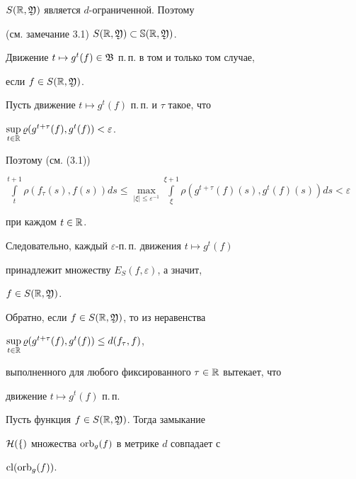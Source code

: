 $S(\Bbb R,\frak Y)$ является $d$-ограниченной. Поэтому


(см. замечание 3.1) $S(\Bbb R,\frak Y)\subset\Bbb S(\Bbb R,\frak Y)$.








\begin{lems}


Движение $t\mapsto g^t(f)\in\frak B$ п.\,п. в том и только том случае,


если $f\in S(\Bbb R,\frak Y)$.


\end{lems}








\begin{pf}


Пусть движение $t\mapsto g^{t}(f)$ п.\,п. и $\tau$ такое, что


$\sup\limits_{t\in\Bbb R}\varrho(g^{t+\tau}(f),g^{t}(f))<\varepsilon$.


Поэтому (см. (3.1))


$\int\limits_t^{t+1}\rho(f_{\tau}(s),f(s))ds\le


\max\limits_{|\xi|\le\varepsilon^{-1}}


\int\limits_\xi^{\xi+1}\rho(g^{t+\tau}(f)(s),g^t(f)(s))ds<\varepsilon$


при каждом $t\in\Bbb R$.


Следовательно, каждый $\varepsilon$-п.\,п. движения $t\mapsto g^{t}(f)$


принадлежит множеству $E_{S}(f,\varepsilon)$, а значит,


$f\in S(\Bbb R,\frak Y)$.





Обратно, если $f\in S(\Bbb R,\frak Y)$, то из неравенства


$\sup\limits_{t\in\Bbb R}\varrho(g^{t+\tau}(f),g^t(f))


\le d(f_{\tau},f)$,


выполненного для любого фиксированного $\tau\in\Bbb R$ вытекает, что


движение $t\mapsto g^{t}(f)$ п.\,п.


\end{pf}








\begin{lems}


Пусть функция $f\in S(\Bbb R,\frak Y)$. Тогда замыкание


$\cal H(f)$ множества $\operatorname{orb}_g(f)$ в метрике $d$ совпадает с


$\operatorname{cl}(\operatorname{orb}_g(f))$.


\end{lems}








